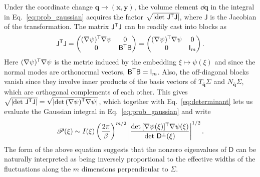 Under the coordinate change $\bm{q} \to (\bm{x},\bm{y})$, the volume element $\dd{\bm{q}}$ in the integral in Eq.~\eqref{eq:prob_gaussian} acquires the factor $\sqrt{\lvert\det\,\mathsf{J}^\mathsf{T}\mathsf{J}\rvert}$, where $\mathsf{J}$ is the Jacobian of the transformation.
The matrix $\mathsf{J}^\mathsf{T}\mathsf{J}$ can be readily cast into blocks as
%
\begin{equation}
  \mathsf{J}^\mathsf{T}\mathsf{J} =
  \begin{pmatrix}
    (\nabla\psi)^\mathsf{T}\nabla\psi & 0 \\
    0 & \mathsf{B}^\mathsf{T}\mathsf{B}
  \end{pmatrix}
  =
  \begin{pmatrix}
    (\nabla\psi)^\mathsf{T}\nabla\psi & 0 \\
    0 & \mathsf{I}_{m}
  \end{pmatrix}.
\end{equation}
%
Here $(\nabla\psi)^\mathsf{T}\nabla\psi$ is the metric induced by the embedding $\xi \mapsto \psi(\xi)$ and since the normal modes are orthonormal vectors, $\mathsf{B} ^\mathsf{T}\mathsf{B}  = \mathsf{I}_m$.
Also, the off-diagonal blocks vanish since they involve inner products of the basis vectors of $T_{\bar{\bm{q}}}\Sigma$ and $N_{\bar{\bm{q}}}\Sigma$, which are orthogonal complements of each other.
This gives $\sqrt{\lvert\det\,\mathsf{J}^\mathsf{T}\mathsf{J}\rvert} = \sqrt{\smash[b]{\lvert\det\, (\nabla\psi)^\mathsf{T}\nabla\psi\rvert}}$, which together with Eq.~\eqref{eq:determinant} lets us evaluate the Gaussian integral in Eq.~\eqref{eq:prob_gaussian} and write
%
\begin{equation}
  \mathscr{P}(\xi) \sim I(\xi)\left(\frac{2\pi}{\beta}\right)^{m/2}
  \left|\frac{\det\,[\nabla\psi(\xi)]^\mathsf{T}\nabla\psi(\xi)}{\det\,\mathsf{D}^{\perp}(\xi)}\right|^{1/2}.
  \label{eq:mpd_regular}
\end{equation}
The form of the above equation suggests that the nonzero eigenvalues of $\mathsf{D}$ can be naturally interpreted as being inversely proportional to the effective widths of the fluctuations along the $m$ dimensions perpendicular to $\Sigma$.
%
